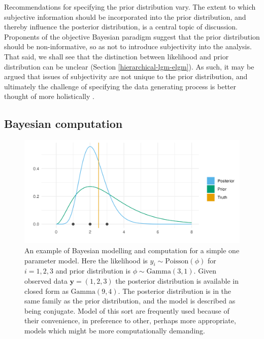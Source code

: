 \documentclass[a4paper, nobind]{templates/ociamthesis}
\begin{document}
Recommendations for specifying the prior distribution vary.
The extent to which subjective information should be incorporated into the prior distribution, and thereby influence the posterior distribution, is a central topic of discussion.
Proponents of the objective Bayesian paradigm suggest that the prior distribution should be non-informative, so as not to introduce subjectivity into the analysis.
That said, we shall see that the distinction between likelihood and prior distribution can be unclear (Section \ref{hierarchical-lgm-elgm}).
As such, it may be argued that issues of subjectivity are not unique to the prior distribution, and ultimately the challenge of specifying the data generating process is better thought of more holistically \autocite{gelman2017prior}.

\hypertarget{bayesian-computation}{%
\subsection{Bayesian computation}\label{bayesian-computation}}



\begin{figure}

{\centering \includegraphics[width=0.95\linewidth]{figures/bayesian/conjugate} 

}

\caption{An example of Bayesian modelling and computation for a simple one parameter model. Here the likelihood is \(y_i \sim \text{Poisson}(\phi)\) for \(i = 1, 2, 3\) and prior distribution is \(\phi \sim \text{Gamma}(3, 1)\). Given observed data \(\mathbf{y} = (1, 2, 3)\) the posterior distribution is available in closed form as \(\text{Gamma}(9, 4)\). The posterior distribution is in the same family as the prior distribution, and the model is described as being conjugate. Model of this sort are frequently used because of their convenience, in preference to other, perhaps more appropriate, models which might be more computationally demanding.}\label{fig:conjugate}
\end{figure}
\end{document}
